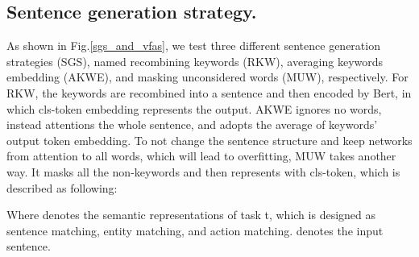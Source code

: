 \documentclass[letterpaper]{article} \usepackage{aaai22}  \usepackage{times}  \usepackage{helvet}  \usepackage{courier}  \usepackage[hyphens]{url}  \usepackage{graphicx} \urlstyle{rm} \def\UrlFont{\rm}  \usepackage{natbib}  \usepackage{caption}
\begin{document}
\subsection{Sentence generation strategy.}\label{section:SGS}

As shown in Fig.\ref{sgs_and_vfas}, we test three different sentence generation strategies (SGS), named recombining keywords (RKW), averaging keywords embedding (AKWE), and masking unconsidered words (MUW), respectively. For RKW, the keywords are recombined into a sentence and then encoded by Bert, in which cls-token embedding represents the output. AKWE ignores no words, instead attentions the whole sentence, and adopts the average of keywords' output token embedding. To not change the sentence structure and 
keep networks from attention to all words, which will lead to overfitting, MUW takes another way. It masks all the non-keywords and then represents with cls-token, which is described as following:

Where  denotes the semantic representations of task t, which is designed as sentence matching, entity matching, and action matching.  denotes the input sentence.

\begin{figure*}[t]
\begin{center}
\end{center}
\caption{The diagrams of three sentence generation strategies  (SGS) and three visual frames aggregation schemes (VFAS).}
\label{sgs_and_vfas}
\end{figure*}
\end{document}

